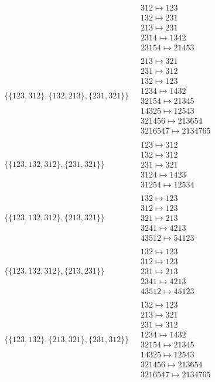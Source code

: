 \begin{scriptsize}
\begin{align}
\ 
&
\begin{matrix}
312 \mapsto 123\\132 \mapsto 231\\213 \mapsto 231\\2314 \mapsto 1342\\23154 \mapsto 21453
\end{matrix}
\\
\{\{123, 312\}, \{132, 213\}, \{231, 321\}\}
\ 
&
\begin{matrix}
213 \mapsto 321\\231 \mapsto 312\\132 \mapsto 123\\1234 \mapsto 1432\\32154 \mapsto 21345\\14325 \mapsto 12543\\321456 \mapsto 213654\\3216547 \mapsto 2134765
\end{matrix}
\\
\{\{123, 132, 312\}, \{231, 321\}\}
\ 
&
\begin{matrix}
123 \mapsto 312\\132 \mapsto 312\\231 \mapsto 321\\3124 \mapsto 1423\\31254 \mapsto 12534
\end{matrix}
\\
\{\{123, 132, 312\}, \{213, 321\}\}
\ 
&
\begin{matrix}
132 \mapsto 123\\312 \mapsto 123\\321 \mapsto 213\\3241 \mapsto 4213\\43512 \mapsto 54123
\end{matrix}
\\
\{\{123, 132, 312\}, \{213, 231\}\}
\ 
&
\begin{matrix}
132 \mapsto 123\\312 \mapsto 123\\231 \mapsto 213\\2341 \mapsto 4213\\43512 \mapsto 45123
\end{matrix}
\\
\{\{123, 132\}, \{213, 321\}, \{231, 312\}\}
\ 
&
\begin{matrix}
132 \mapsto 123\\213 \mapsto 321\\231 \mapsto 312\\1234 \mapsto 1432\\32154 \mapsto 21345\\14325 \mapsto 12543\\321456 \mapsto 213654\\3216547 \mapsto 2134765

\end{matrix}
\end{align}
\end{scriptsize}
